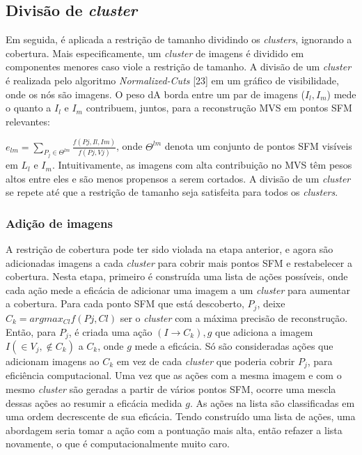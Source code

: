\begin{itemize}
\subsection*{Divisão de \emph{cluster}}
Em seguida, é aplicada a restrição de tamanho dividindo os \emph{clusters}, ignorando a cobertura. Mais especificamente, um \emph{cluster} de imagens é dividido em componentes menores caso viole a restrição de tamanho. A divisão de um \emph{cluster} é realizada pelo algoritmo \emph{Normalized-Cuts} %
[23] em um gráfico de visibilidade, onde os nós são imagens. O peso dA borda entre um par de imagens ($I_l, I_m$) mede o quanto a $I_l$ e $I_m$ contribuem, juntos,  para a reconstrução MVS em pontos SFM relevantes: 

$e_{lm} = \sum_{P_j \in \Theta ^{lm}} \frac{f(Pj,{Il, Im})}{f(Pj, Vj )}$, onde $\Theta ^{lm}$ denota um conjunto de pontos SFM visíveis em $L_l$ e $I_m$. Intuitivamente, as imagens com alta contribuição no MVS têm pesos altos entre eles e são menos propensos a serem cortados. A divisão de um \emph{cluster} se repete até que a restrição de tamanho seja satisfeita para todos os \emph{clusters}.

\subsubsection*{Adição de imagens}
A restrição de cobertura pode ter sido violada na etapa anterior, e agora são adicionadas imagens a cada \emph{cluster} para cobrir mais pontos SFM e restabelecer a cobertura. Nesta etapa, primeiro é construída uma lista de ações possíveis, onde cada ação mede a eficácia de adicionar uma imagem a um \emph{cluster} para aumentar a cobertura. Para cada ponto SFM que está descoberto, $P_j$, deixe $C_k = argmax_{Cl} f(Pj, Cl)$ ser o \emph{cluster} com a máxima precisão de reconstrução. 
Então, para $P_j$, é criada uma ação ${(I \rightarrow C_k), g}$ que adiciona a imagem $I (\in V_j, \not\in C_k)$ a $C_k$, onde $g$ mede a eficácia. Só são consideradas ações que adicionam imagens ao $C_k$ em vez de cada \emph{cluster} que poderia cobrir $P_j$, para eficiência computacional. Uma vez que as ações com a mesma imagem e com o mesmo \emph{cluster} são geradas a partir de vários pontos SFM, ocorre uma mescla dessas ações ao resumir a eficácia medida $g$. As ações na lista são classificadas em uma ordem decrescente de sua eficácia. Tendo construído uma lista de ações, uma abordagem seria tomar a ação com a pontuação mais alta, então refazer a lista novamente, o que é computacionalmente muito caro. 


\end{itemize}
